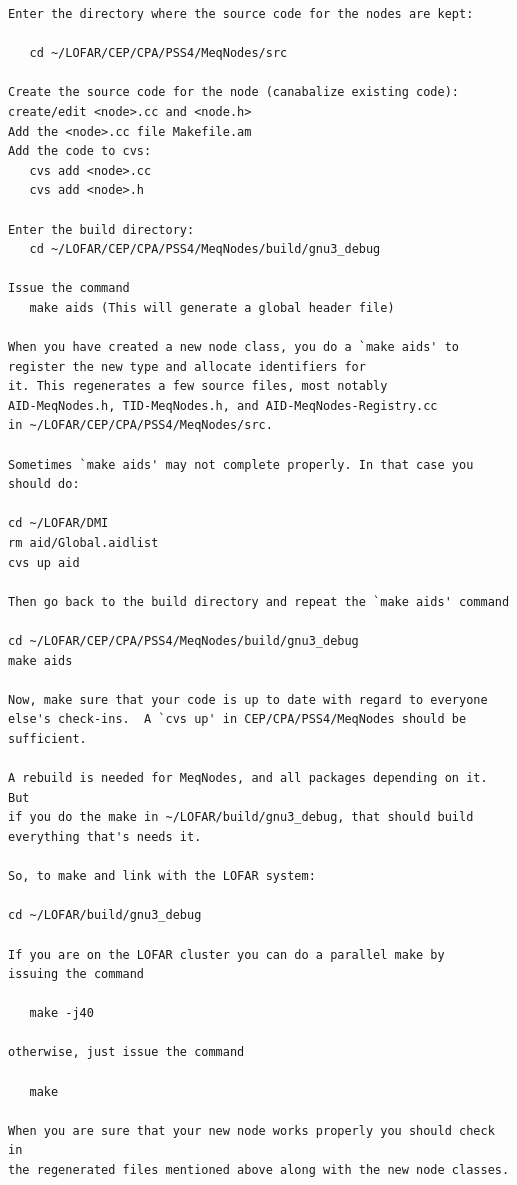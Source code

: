 \documentclass[10pt]{article}
\begin{document}
\begin{verbatim}
Enter the directory where the source code for the nodes are kept:

   cd ~/LOFAR/CEP/CPA/PSS4/MeqNodes/src

Create the source code for the node (canabalize existing code):
create/edit <node>.cc and <node.h>
Add the <node>.cc file Makefile.am
Add the code to cvs:
   cvs add <node>.cc
   cvs add <node>.h

Enter the build directory:
   cd ~/LOFAR/CEP/CPA/PSS4/MeqNodes/build/gnu3_debug

Issue the command
   make aids (This will generate a global header file)

When you have created a new node class, you do a `make aids' to 
register the new type and allocate identifiers for
it. This regenerates a few source files, most notably
AID-MeqNodes.h, TID-MeqNodes.h, and AID-MeqNodes-Registry.cc 
in ~/LOFAR/CEP/CPA/PSS4/MeqNodes/src. 

Sometimes `make aids' may not complete properly. In that case you
should do:

cd ~/LOFAR/DMI
rm aid/Global.aidlist
cvs up aid

Then go back to the build directory and repeat the `make aids' command

cd ~/LOFAR/CEP/CPA/PSS4/MeqNodes/build/gnu3_debug
make aids

Now, make sure that your code is up to date with regard to everyone 
else's check-ins.  A `cvs up' in CEP/CPA/PSS4/MeqNodes should be sufficient.
                                                                                
A rebuild is needed for MeqNodes, and all packages depending on it. But
if you do the make in ~/LOFAR/build/gnu3_debug, that should build
everything that's needs it.

So, to make and link with the LOFAR system:

cd ~/LOFAR/build/gnu3_debug

If you are on the LOFAR cluster you can do a parallel make by
issuing the command

   make -j40 

otherwise, just issue the command

   make

When you are sure that your new node works properly you should check in 
the regenerated files mentioned above along with the new node classes.

\end{verbatim}
\end{document}
